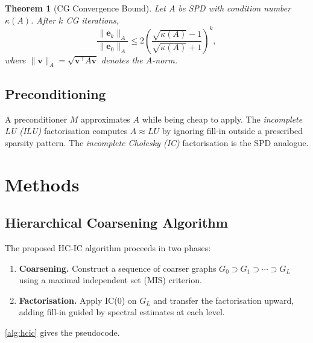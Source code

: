\documentclass[
    12pt,
    a4paper,
    twoside,           %
    openright          %
]{book}
\newtheorem{theorem}{Theorem}[chapter]
\newcommand{\norm}[1]{\lVert #1 \rVert}  %
\begin{document}
\begin{theorem}[CG Convergence Bound]
    \label{thm:convergence_bound}
    Let $A$ be SPD with condition number $\kappa(A)$.  After $k$ CG
    iterations,
    \[
        \frac{\norm{\mathbf{e}_k}_A}{\norm{\mathbf{e}_0}_A}
        \leq 2\left(\frac{\sqrt{\kappa(A)}-1}{\sqrt{\kappa(A)}+1}\right)^k,
    \]
    where $\norm{\mathbf{v}}_A = \sqrt{\mathbf{v}^\top A\mathbf{v}}$ denotes
    the $A$-norm.
\end{theorem}

\section{Preconditioning}
\label{sec:preconditioning}

A preconditioner $M$ approximates $A$ while being cheap to apply.  The
\emph{incomplete LU (ILU)} factorisation \cite{meijerink1977iterative}
computes $A \approx LU$ by ignoring fill-in outside a prescribed sparsity
pattern.  The \emph{incomplete Cholesky (IC)} factorisation is the SPD
analogue.


\chapter{Methods}
\label{chap:methods}

\section{Hierarchical Coarsening Algorithm}
\label{sec:hc_algorithm}

The proposed HC-IC algorithm proceeds in two phases:

\begin{enumerate}
    \item \textbf{Coarsening.}  Construct a sequence of coarser graphs
          $G_0 \supset G_1 \supset \cdots \supset G_L$ using a maximal
          independent set (MIS) criterion.
    \item \textbf{Factorisation.}  Apply IC(0) on $G_L$ and transfer the
          factorisation upward, adding fill-in guided by spectral estimates
          at each level.
\end{enumerate}

\cref{alg:hcic} gives the pseudocode.
\end{document}
